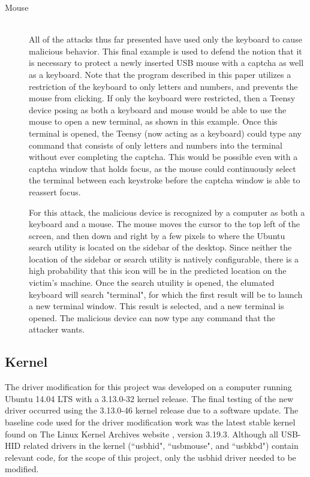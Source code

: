 \documentclass[pagenumbers]{ieee}
\begin{document}
\begin{description}
\item[Mouse] \hfill \\
All of the attacks thus far presented have used only the keyboard to cause malicious behavior. This final example is used to defend the notion that it is necessary to protect a newly inserted USB mouse with a captcha as well as a keyboard. Note that the program described in this paper utilizes a restriction of the keyboard to only letters and numbers, and prevents the mouse from clicking.  If only the keyboard were restricted, then a Teensy device posing as both a keyboard and mouse would be able to use the mouse to open a new terminal, as shown in this example. Once this terminal is opened, the Teensy (now acting as a keyboard) could type any command that consists of only letters and numbers into the terminal without ever completing the captcha. This would be possible even with a captcha window that holds focus, as the mouse could continuously select the terminal between each keystroke before the captcha window is able to reassert focus.

For this attack, the malicious device is recognized by a computer as both a keyboard and a mouse.  The mouse moves the cursor to the top left of the screen, and then down and right by a few pixels to where the Ubuntu search utility is located on the sidebar of the desktop. Since neither the location of the sidebar or search utility is natively configurable, there is a high probability that this icon will be in the predicted location on the victim's machine. Once the search utuility is opened, the elumated keyboard will search "terminal", for which the first result will be to launch a new terminal window.  This result is selected, and a new terminal is opened. The malicious device can now type any command that the attacker wants.
\end{description}


\subsection{Kernel}
\label{section:kernel}

The driver modification for this project was developed on a computer running Ubuntu 14.04 LTS with a 3.13.0-32 kernel release. The final testing of the new driver occurred using the 3.13.0-46 kernel release due to a software update. The baseline code used for the driver modification work was the latest stable kernel found on The Linux Kernel Archives website \cite{kernel}, version 3.19.3. Although all USB-HID related drivers in the kernel (``usbhid", ``usbmouse", and ``usbkbd") contain relevant code, for the scope of this project, only the usbhid driver needed to be modified.
\end{document}
